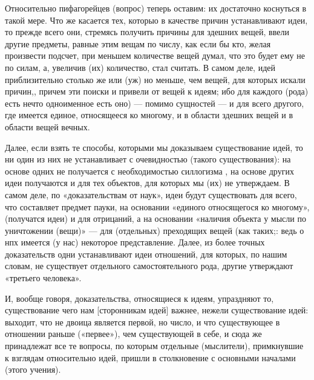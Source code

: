 \documentclass{article}
\begin{document}
Относительно пифагорейцев (вопрос) теперь оставим: их достаточно коснуться в такой мере. Что же касается тех, которыо в качестве причин устанавливают идеи, то прежде всего они, стремясь получить причины для здешних вещей, ввели другие предметы, равные этим вещам по числу, как если бы кто, желая произвести подсчет, при меньшем количестве вещей думал, что это будет ему не по силам, а, увеличив (их) количество, стал считать. В самом деле, идей приблизительно столько же или (уж) но меньше, чем вещей,
\footnotemark[1]
для которых искали причин,, причем эти поиски и привели от вещей к идеям; ибо для каждого (рода) есть нечто одноименное есть оно) — помимо сущностей — и для всего другого, где имеется единое, относящееся ко многому, и в области здешних вещей и в области вещей вечных.

Далее, если взять те способы, которыми мы  доказываем существование идей, то ни один из них не устанавливает с очевидностью (такого существования):
\footnotemark[2]
на основе одних не получается с необходимостью силлогизма , на основе других идеи получаются и для тех объектов, для которых мы (их) не утверждаем. В самом деле, по «доказательствам от наук»,
\footnotemark[3]
идеи будут существовать для всего, что составляет предмет пауки, на основании «единого относящегося ко многому»,
\footnotemark[4]
(получатся идеи) и для отрицаний, а на основании «наличия объекта у мысли по уничтожении (вещи)»
\footnotemark[5]
— для (отдельных) преходящих вещей (как таких;: ведь о нпх имеется (у нас) некоторое представление. Далее, из более точных доказательств
\footnotemark[6]
одни устанавливают идеи отношений, для которых, по нашим словам, не существует отдельного самостоятельного рода,
\footnotemark[7]
другие утверждают «третьего человека».
\footnotemark[8]


И, вообще говоря, доказательства, относящиеся к идеям, упраздняют то, существование чего нам [сторонникам идей]
\footnotemark[9]
важнее, нежели существование идей: выходит, что не двоица является первой, но число, и что существующее в отношении раньше («первее»), чем существующей в себе, и сюда же принадлежат все те вопросы, по которым отдельные (мыслители), примкнувшие к взглядам относительно идей, пришли в столкновение с основными началами (этого учения).
\end{document}
